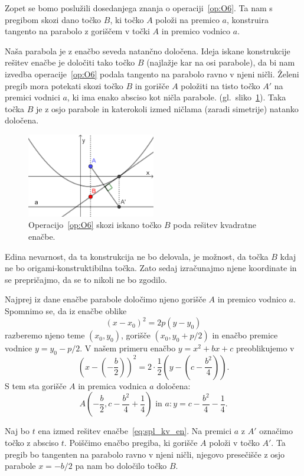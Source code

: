 Zopet se bomo poslužili dosedanjega znanja o operaciji~\ref{op:O6}. Ta nam s pregibom skozi dano točko $B$, ki točko $A$ položi na premico $a$, konstruira tangento na parabolo z goriščem v točki $A$ in premico vodnico $a$.

Naša parabola je z enačbo seveda natančno določena. Ideja iskane konstrukcije rešitev enačbe je določiti tako točko $B$ (najlažje kar na osi parabole), da bi nam izvedba operacije~\ref{op:O6} podala tangento na parabolo ravno v njeni ničli. Želeni pregib mora potekati skozi točko $B$ in gorišče $A$ položiti na tisto točko $A'$ na premici vodnici $a$, ki ima enako absciso kot ničla parabole. (gl.\ sliko~\ref{fig:tockaB_in_O6}). Taka točka $B$ je z osjo parabole in katerokoli izmed ničlama (zaradi simetrije) natanko določena.

\begin{figure}[h]
    \centering
    \includegraphics[width=0.5\textwidth]{images/kvadratna_enacba/tockaB_in_O6.png}
    \caption[Iskanje točke $B$]{Operacijo~\ref{op:O6} skozi iskano točko $B$ poda rešitev kvadratne enačbe.}
    \label{fig:tockaB_in_O6}
\end{figure}

Edina nevarnost, da ta konstrukcija ne bo delovala, je možnost, da točka $B$ kdaj ne bo origami-konstruktibilna točka. Zato sedaj izračunajmo njene koordinate in se prepričajmo, da se to nikoli ne bo zgodilo.

Najprej iz dane enačbe parabole določimo njeno gorišče $A$ in premico vodnico $a$. Spomnimo se, da iz enačbe oblike
$$ (x - x_0)^2 = 2p(y - y_0) $$
razberemo njeno teme $(x_0, y_0)$, gorišče $(x_0, y_0 + p/2)$ in enačbo premice vodnice $y = y_0 - p/2$. V našem primeru enačbo $y = x^2 + bx + c$ preoblikujemo v
$$ \left(x-\left(-\frac{b}{2}\right)\right)^2 = 2 \cdot \frac{1}{2} \left(y - \left(c - \frac{b^2}{4}\right)\right). $$
S tem sta gorišče $A$ in premica vodnica $a$ določena:
$$ A\left(-\frac{b}{2}, c - \frac{b^2}{4} + \frac{1}{4}\right) \text{ in } a: y = c - \frac{b^2}{4} - \frac{1}{4}. $$

Naj bo $t$ ena izmed rešitev enačbe~\ref{eq:spl_kv_en}. Na premici $a$ z $A'$ označimo točko z absciso $t$. Poiščimo enačbo pregiba, ki gorišče $A$ položi v točko $A'$. Ta pregib bo tangenten na parabolo ravno v njeni ničli, njegovo presečišče z osjo parabole $ x = -b/2 $ pa nam bo določilo točko $B$.

